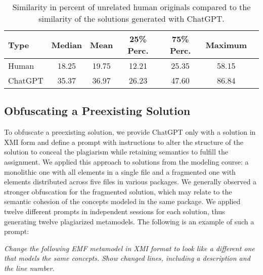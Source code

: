 \begin{table}
		\centering
		\begin{tabular}{lcccccc}
			\toprule
			{Type}             & {Median} & {Mean}  & {25\% Perc.} & {75\% Perc.} & {Maximum} \\
			\midrule
			Human   & 18.25        & 19.75          & 12.21       & 25.35   & 58.15    \\
			ChatGPT & 35.37        & 36.97          & 26.23       & 47.60    & 86.84  \\
			\bottomrule
		\end{tabular}
        \caption[Similarity of Human vs. AI-Generated Solutions]{Similarity in percent of unrelated human originals compared to the similarity of the solutions generated with ChatGPT.}
		\label{tab:summary-fully}
\end{table}


\subsection{Obfuscating a Preexisting Solution}

\label{subsec:chatgpt-obf}
To obfuscate a preexisting solution, we provide ChatGPT only with a solution in \ac{XMI} form and define a prompt with instructions to alter the structure of the solution to conceal the plagiarism while retaining semantics to fulfill the assignment.
We applied this approach to solutions from the modeling course: a monolithic one with all elements in a single file and a fragmented one with elements distributed across five files in various packages.
We generally observed a stronger obfuscation for the fragmented solution, which may relate to the semantic cohesion of the concepts modeled in the same package.
%
We applied twelve different prompts in independent sessions for each solution, thus generating twelve plagiarized metamodels.
The following is an example of such a prompt:
\begin{myquote}
\textit{Change the following \ac{EMF} metamodel in \ac{XMI} format to look like a different one that models the same concepts.
Show changed lines, including a description and the line number.}
\end{myquote}

